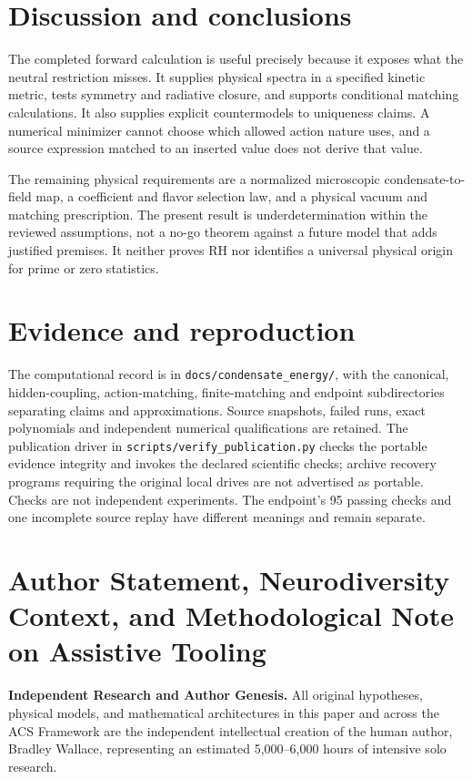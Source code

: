 \documentclass[11pt]{article}
\begin{document}
\section{Discussion and conclusions}
The completed forward calculation is useful precisely because it exposes
what the neutral restriction misses. It supplies physical spectra in a
specified kinetic metric, tests symmetry and radiative closure, and supports
conditional matching calculations. It also supplies explicit countermodels
to uniqueness claims. A numerical minimizer cannot choose which allowed
action nature uses, and a source expression matched to an inserted value
does not derive that value.

The remaining physical requirements are a normalized microscopic
condensate-to-field map, a coefficient and flavor selection law, and a
physical vacuum and matching prescription. The present result is
underdetermination within the reviewed assumptions, not a no-go theorem
against a future model that adds justified premises. It neither proves RH
nor identifies a universal physical origin for prime or zero statistics.

\appendix
\section{Evidence and reproduction}
The computational record is in \texttt{docs/condensate\_energy/}, with
the canonical, hidden-coupling, action-matching, finite-matching and endpoint
subdirectories separating claims and approximations. Source snapshots,
failed runs, exact polynomials and independent numerical qualifications
are retained. The publication driver in
\nolinkurl{scripts/verify_publication.py} checks the portable evidence
integrity and invokes the declared scientific checks; archive recovery
programs requiring the original local drives are not advertised as portable.
Checks are not independent experiments. The endpoint's 95 passing checks
and one incomplete source replay have different meanings and remain separate.

\section*{Author Statement, Neurodiversity Context, and Methodological Note on Assistive Tooling}
\noindent\textbf{Independent Research and Author Genesis.} 
All original hypotheses, physical models, and mathematical architectures in this paper and across the ACS Framework are the independent intellectual creation of the human author, Bradley Wallace, representing an estimated 5,000--6,000 hours of intensive solo research.
\end{document}
